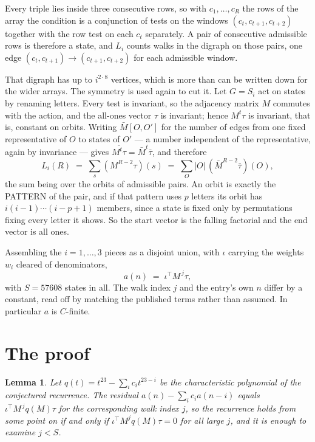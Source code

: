 \documentclass[11pt,a4paper]{article}
\theoremstyle{plain}
\newtheorem{lemma}[theorem]{Lemma}
\theoremstyle{definition}
\begin{document}
Every triple lies inside three consecutive rows, so with $c_1,\dots,c_R$ the rows of the array
the condition is a conjunction of tests on the windows $(c_{t},c_{t+1},c_{t+2})$ together
with the row test on each $c_t$ separately. A pair of consecutive admissible rows is therefore
a state, and $L_i$ counts walks in the digraph on those pairs, one edge $(c_t,c_{t+1})\to
(c_{t+1},c_{t+2})$ for each admissible window.

That digraph has up to $i^{2\cdot8}$ vertices, which is more than can be written down for
the wider arrays. The symmetry is used again to cut it. Let $G=S_i$ act on states by renaming
letters. Every test is invariant, so the adjacency matrix $M$ commutes with the action, and the
all-ones vector $\tau$ is invariant; hence $M^{t}\tau$ is invariant, that is, constant on
orbits. Writing $\bar M[O,O']$ for the number of edges from one fixed representative of $O$ to
states of $O'$ --- a number independent of the representative, again by invariance --- gives
$\overline{M^{t}\tau}=\bar M^{t}\bar\tau$, and therefore
\[
L_i(R)\;=\;\sum_{s}(M^{R-2}\tau)(s)\;=\;\sum_{O}|O|\,(\bar M^{R-2}\bar\tau)(O),
\]
the sum being over the orbits of admissible pairs. An orbit is exactly the PATTERN of the pair,
and if that pattern uses $p$ letters its orbit has $i(i-1)\cdots(i-p+1)$ members, since a state
is fixed only by permutations fixing every letter it shows. So the start vector is the falling
factorial and the end vector is all ones.

Assembling the $i=1,\dots,3$ pieces as a disjoint union, with $\iota$ carrying the weights
$w_i$ cleared of denominators,
\[
a(n)\;=\;\iota^{\!\top}M^{\,j}\tau ,
\]
with $S=57608$ states in all. The walk index $j$ and the entry's own $n$ differ by a constant,
read off by matching the published terms rather than assumed. In particular $a$ is $C$-finite.

\section{The proof}

\begin{lemma}\label{lem:crit}
Let $q(t)=t^{23}-\sum_i c_it^{23-i}$ be the characteristic polynomial of the
conjectured recurrence. The residual $a(n)-\sum_ic_ia(n-i)$ equals
$\iota^{\!\top}M^{\,j}q(M)\tau$ for the corresponding walk index $j$, so the recurrence
holds from some point on if and only if $\iota^{\!\top}M^{j}q(M)\tau=0$ for all large $j$,
and it is enough to examine $j<S$.
\end{lemma}
\end{document}
